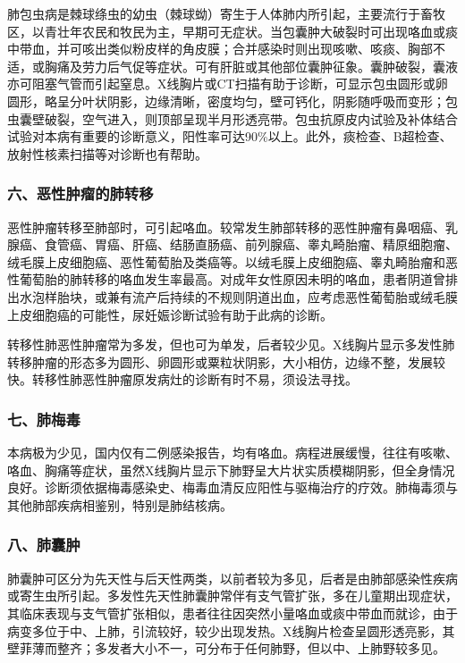 肺包虫病是棘球绦虫的幼虫（棘球蚴）寄生于人体肺内所引起，主要流行于畜牧区，以青壮年农民和牧民为主，早期可无症状。当包囊肿大破裂时可出现咯血或痰中带血，并可咳出类似粉皮样的角皮膜；合并感染时则出现咳嗽、咳痰、胸部不适，或胸痛及劳力后气促等症状。可有肝脏或其他部位囊肿征象。囊肿破裂，囊液亦可阻塞气管而引起窒息。X线胸片或CT扫描有助于诊断，可显示包虫圆形或卵圆形，略呈分叶状阴影，边缘清晰，密度均匀，壁可钙化，阴影随呼吸而变形；包虫囊壁破裂，空气进入，则顶部呈现半月形透亮带。包虫抗原皮内试验及补体结合试验对本病有重要的诊断意义，阳性率可达90\%以上。此外，痰检查、B超检查、放射性核素扫描等对诊断也有帮助。

\subsubsection{六、恶性肿瘤的肺转移}

恶性肿瘤转移至肺部时，可引起咯血。较常发生肺部转移的恶性肿瘤有鼻咽癌、乳腺癌、食管癌、胃癌、肝癌、结肠直肠癌、前列腺癌、睾丸畸胎瘤、精原细胞瘤、绒毛膜上皮细胞癌、恶性葡萄胎及类癌等。以绒毛膜上皮细胞癌、睾丸畸胎瘤和恶性葡萄胎的肺转移的咯血发生率最高。对成年女性原因未明的咯血，患者阴道曾排出水泡样胎块，或兼有流产后持续的不规则阴道出血，应考虑恶性葡萄胎或绒毛膜上皮细胞癌的可能性，尿妊娠诊断试验有助于此病的诊断。

转移性肺恶性肿瘤常为多发，但也可为单发，后者较少见。X线胸片显示多发性肺转移肿瘤的形态多为圆形、卵圆形或粟粒状阴影，大小相仿，边缘不整，发展较快。转移性肺恶性肿瘤原发病灶的诊断有时不易，须设法寻找。

\subsubsection{七、肺梅毒}

本病极为少见，国内仅有二例感染报告，均有咯血。病程进展缓慢，往往有咳嗽、咯血、胸痛等症状，虽然X线胸片显示下肺野呈大片状实质模糊阴影，但全身情况良好。诊断须依据梅毒感染史、梅毒血清反应阳性与驱梅治疗的疗效。肺梅毒须与其他肺部疾病相鉴别，特别是肺结核病。

\subsubsection{八、肺囊肿}

肺囊肿可区分为先天性与后天性两类，以前者较为多见，后者是由肺部感染性疾病或寄生虫所引起。多发性先天性肺囊肿常伴有支气管扩张，多在儿童期出现症状，其临床表现与支气管扩张相似，患者往往因突然小量咯血或痰中带血而就诊，由于病变多位于中、上肺，引流较好，较少出现发热。X线胸片检查呈圆形透亮影，其壁菲薄而整齐；多发者大小不一，可分布于任何肺野，但以中、上肺野较多见。

